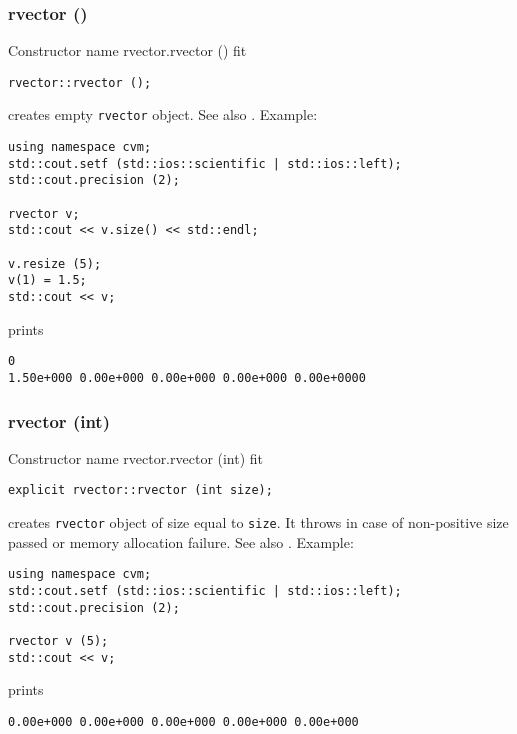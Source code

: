 \subsubsection{rvector ()}
Constructor%
\pdfdest name {rvector.rvector ()} fit
\begin{verbatim}
rvector::rvector ();
\end{verbatim}
creates  empty \verb"rvector" object.
See also .
Example:
\begin{Verbatim}
using namespace cvm;
std::cout.setf (std::ios::scientific | std::ios::left); 
std::cout.precision (2);

rvector v;
std::cout << v.size() << std::endl;

v.resize (5);
v(1) = 1.5;
std::cout << v;
\end{Verbatim}
prints
\begin{Verbatim}
0
1.50e+000 0.00e+000 0.00e+000 0.00e+000 0.00e+0000
\end{Verbatim}
\newpage


\subsubsection{rvector (int)}
Constructor%
\pdfdest name {rvector.rvector (int)} fit
\begin{verbatim}
explicit rvector::rvector (int size);
\end{verbatim}
creates \verb"rvector" object of size equal to \verb"size".
It throws  
in case of non-positive size passed or memory allocation failure.
See also .
Example:
\begin{Verbatim}
using namespace cvm;
std::cout.setf (std::ios::scientific | std::ios::left); 
std::cout.precision (2);

rvector v (5);
std::cout << v;
\end{Verbatim}
prints
\begin{Verbatim}
0.00e+000 0.00e+000 0.00e+000 0.00e+000 0.00e+000
\end{Verbatim}
\newpage



